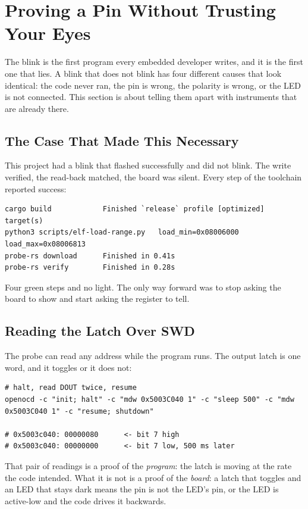 \section{Proving a Pin Without Trusting Your Eyes}
\label{sec:gpio-proving}

The blink is the first program every embedded developer writes, and it is the first one that lies. A
blink that does not blink has four different causes that look identical: the code never ran, the pin
is wrong, the polarity is wrong, or the LED is not connected. This section is about telling them
apart with instruments that are already there.

\subsection{The Case That Made This Necessary}

This project had a blink that flashed successfully and did not blink. The write verified, the
read-back matched, the board was silent. Every step of the toolchain reported success:

\begin{verbatim}
cargo build            Finished `release` profile [optimized] target(s)
python3 scripts/elf-load-range.py   load_min=0x08006000 load_max=0x08006813
probe-rs download      Finished in 0.41s
probe-rs verify        Finished in 0.28s
\end{verbatim}

Four green steps and no light. The only way forward was to stop asking the board to show and start
asking the register to tell.

\subsection{Reading the Latch Over SWD}

The probe can read any address while the program runs. The output latch is one word, and it toggles
or it does not:

\begin{verbatim}
# halt, read DOUT twice, resume
openocd -c "init; halt" -c "mdw 0x5003C040 1" -c "sleep 500" -c "mdw 0x5003C040 1" -c "resume; shutdown"

# 0x5003c040: 00000080      <- bit 7 high
# 0x5003c040: 00000000      <- bit 7 low, 500 ms later
\end{verbatim}

That pair of readings is a proof of the \emph{program}: the latch is moving at the rate the code
intended. What it is not is a proof of the \emph{board}: a latch that toggles and an LED that stays
dark means the pin is not the LED's pin, or the LED is active-low and the code drives it backwards.

